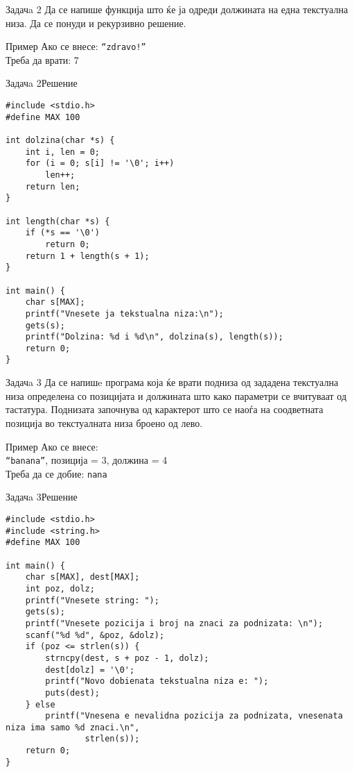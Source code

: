 \begin{frame}{Задачa 2}
Да се напише функција што ќе ја одреди должината на една текстуална низа. Да се
понуди и рекурзивно решение.
\begin{exampleblock}{Пример} 
Ако се внесе: \texttt{``zdravo!''}\\
Треба да врати: 7
\end{exampleblock}
\end{frame}

\begin{frame}[fragile]{Задачa 2}{Решение} 
\begin{lstlisting}
#include <stdio.h>
#define MAX 100

int dolzina(char *s) {
    int i, len = 0;
    for (i = 0; s[i] != '\0'; i++)
        len++;
    return len;
}

int length(char *s) {
    if (*s == '\0')
        return 0;
    return 1 + length(s + 1);
}

int main() {
    char s[MAX];
    printf("Vnesete ja tekstualna niza:\n");
    gets(s);
    printf("Dolzina: %d i %d\n", dolzina(s), length(s));
    return 0;
}

\end{lstlisting}
\end{frame}

\begin{frame}{Задачa 3}
    Да се напишe програма која ќе врати подниза од зададена текстуална низа
    определена со позицијата и должината што како параметри се вчитуваат од
    тастатура. Поднизата започнува од карактерот што се наоѓа на соодветната
    позиција во текстуалната низа броено од лево. 
\begin{exampleblock}{Пример}
Ако се внесе:\\
\texttt{``banana''}, позиција = 3, должина = 4\\
Треба да се добие: \texttt{nana}
\end{exampleblock}    
\end{frame}


\begin{frame}[fragile]{Задачa 3}{Решение}
\begin{lstlisting}
#include <stdio.h>
#include <string.h>
#define MAX 100

int main() {
    char s[MAX], dest[MAX];
    int poz, dolz;
    printf("Vnesete string: ");
    gets(s);
    printf("Vnesete pozicija i broj na znaci za podnizata: \n");
    scanf("%d %d", &poz, &dolz);
    if (poz <= strlen(s)) {
        strncpy(dest, s + poz - 1, dolz);
        dest[dolz] = '\0';
        printf("Novo dobienata tekstualna niza e: ");
        puts(dest);
    } else
        printf("Vnesena e nevalidna pozicija za podnizata, vnesenata niza ima samo %d znaci.\n",
                strlen(s));
    return 0;
}
\end{lstlisting}
\end{frame}

